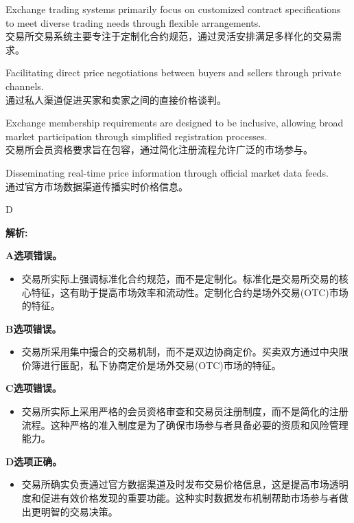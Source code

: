 \documentclass{article}
\newenvironment{explanation}
{\textbf{解析:}\par}
{\par}
\begin{document}
\begin{choices}
    \item Exchange trading systems primarily focus on customized contract specifications to meet diverse trading needs through flexible arrangements.\\
    交易所交易系统主要专注于定制化合约规范，通过灵活安排满足多样化的交易需求。
    
    \item Facilitating direct price negotiations between buyers and sellers through private channels.\\
    通过私人渠道促进买家和卖家之间的直接价格谈判。
    
    \item Exchange membership requirements are designed to be inclusive, allowing broad market participation through simplified registration processes.\\
    交易所会员资格要求旨在包容，通过简化注册流程允许广泛的市场参与。
    
    \item Disseminating real-time price information through official market data feeds.\\
    通过官方市场数据渠道传播实时价格信息。
\end{choices}

\begin{correctanswer}
    D
\end{correctanswer}

\begin{explanation}
    \textbf{A选项错误。}
    \begin{itemize}
        \item 交易所实际上强调标准化合约规范，而不是定制化。标准化是交易所交易的核心特征，这有助于提高市场效率和流动性。定制化合约是场外交易(OTC)市场的特征。
    \end{itemize}

    \textbf{B选项错误。}
    \begin{itemize}
        \item 交易所采用集中撮合的交易机制，而不是双边协商定价。买卖双方通过中央限价簿进行匿配，私下协商定价是场外交易(OTC)市场的特征。
    \end{itemize}

    \textbf{C选项错误。}
    \begin{itemize}
        \item 交易所实际上采用严格的会员资格审查和交易员注册制度，而不是简化的注册流程。这种严格的准入制度是为了确保市场参与者具备必要的资质和风险管理能力。
    \end{itemize}

    \textbf{D选项正确。}
    \begin{itemize}
        \item 交易所确实负责通过官方数据渠道及时发布交易价格信息，这是提高市场透明度和促进有效价格发现的重要功能。这种实时数据发布机制帮助市场参与者做出更明智的交易决策。
    \end{itemize}
\end{explanation}
\end{document}
